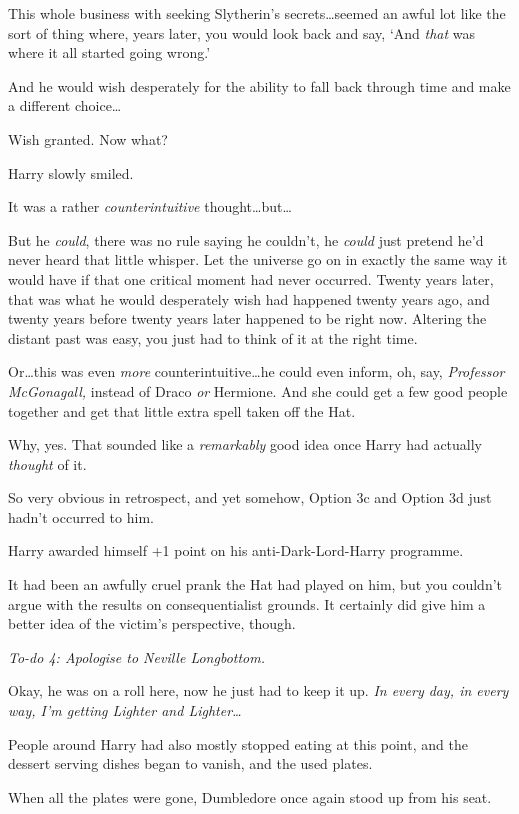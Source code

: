 This whole business with seeking Slytherin’s secrets…seemed an awful lot like the sort of thing where, years later, you would look back and say, ‘And \emph{that} was where it all started going wrong.’

And he would wish desperately for the ability to fall back through time and make a different choice…

Wish granted. Now what?

Harry slowly smiled.

It was a rather \emph{counterintuitive} thought…but…

But he \emph{could}, there was no rule saying he couldn’t, he \emph{could} just pretend he’d never heard that little whisper. Let the universe go on in exactly the same way it would have if that one critical moment had never occurred. Twenty years later, that was what he would desperately wish had happened twenty years ago, and twenty years before twenty years later happened to be right now. Altering the distant past was easy, you just had to think of it at the right time.

Or…this was even \emph{more} counterintuitive…he could even inform, oh, say, \emph{Professor McGonagall,} instead of Draco \emph{or} Hermione. And she could get a few good people together and get that little extra spell taken off the Hat.

Why, yes. That sounded like a \emph{remarkably} good idea once Harry had actually \emph{thought} of it.

So very obvious in retrospect, and yet somehow, Option 3c and Option 3d just hadn’t occurred to him.

Harry awarded himself +1 point on his anti-Dark-Lord-Harry programme.

It had been an awfully cruel prank the Hat had played on him, but you couldn’t argue with the results on consequentialist grounds. It certainly did give him a better idea of the victim’s perspective, though.

\emph{To-do 4: Apologise to Neville Longbottom.}

Okay, he was on a roll here, now he just had to keep it up. \emph{In every day, in every way, I’m getting Lighter and Lighter…}

People around Harry had also mostly stopped eating at this point, and the dessert serving dishes began to vanish, and the used plates.

When all the plates were gone, Dumbledore once again stood up from his seat.

